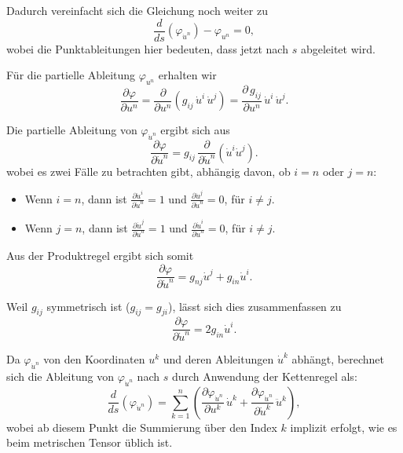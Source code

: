 Dadurch vereinfacht sich die Gleichung noch weiter zu
\begin{equation}
	\frac{d}{ds} \left( \varphi_{\dot{u}^n} \right) - \varphi_{u^n} = 0,
\end{equation}
wobei die Punktableitungen hier bedeuten, dass jetzt nach $s$ abgeleitet wird.

Für die partielle Ableitung $\varphi_{u^n}$ erhalten wir
\begin{equation} 
	\frac{\partial \varphi}{\partial u^n} = \frac{\partial}{\partial u^n} \left(g_{ij} \, \dot{u}^i \, \dot{u}^j\right) = \frac{\partial \, g_{ij}}{\partial u^n} \, \dot{u}^i \, \dot{u}^j. 
\end{equation}

Die partielle Ableitung von $\varphi_{\dot{u}^n}$ ergibt sich aus
\begin{equation}
	\frac{\partial \varphi}{\partial \dot{u}^n} = g_{ij} \, \frac{\partial}{\partial \dot{u}^n} \left( \dot{u}^i \dot{u}^j \right).
\end{equation}
wobei es zwei Fälle zu betrachten gibt, abhängig davon, ob $i = n$ oder $j = n$:
\begin{itemize}
	\item Wenn $i = n$, dann ist $\frac{\partial \dot{u}^i}{\partial \dot{u}^n} = 1$ und $\frac{\partial \dot{u}^j}{\partial \dot{u}^n} = 0$, für $i \neq j$.
	\item Wenn $j = n$, dann ist $\frac{\partial \dot{u}^j}{\partial \dot{u}^n} = 1$ und $\frac{\partial \dot{u}^i}{\partial \dot{u}^n} = 0$, für $i \neq j$.
\end{itemize}

Aus der Produktregel ergibt sich somit
\begin{equation}
	\frac{\partial \varphi}{\partial \dot{u}^n} = g_{nj} \dot{u}^j + g_{in} \dot{u}^i.
\end{equation}

Weil $g_{ij}$ symmetrisch ist ($g_{ij} = g_{ji}$), lässt sich dies zusammenfassen zu
\begin{equation}
	\frac{\partial \varphi}{\partial \dot{u}^n} = 2g_{in} \dot{u}^i.
\end{equation}

Da $\varphi_{\dot{u}^n}$ von den Koordinaten $u^k$ und deren Ableitungen $\dot{u}^k$ abhängt, berechnet sich die Ableitung von $\varphi_{\dot{u}^n}$ nach $s$ durch Anwendung der Kettenregel als:
\begin{equation}
	\frac{d}{ds} \left( \varphi_{\dot{u}^n} \right) = \sum_{k = 1}^n \left( \frac{\partial \varphi_{\dot{u}^n}}{\partial u^k} \, \dot{u}^k + \frac{\partial \varphi_{\dot{u}^n}}{\partial \dot{u}^k} \, \ddot{u}^k \right),
\end{equation}
wobei ab diesem Punkt die Summierung über den Index $k$ implizit erfolgt, wie es beim metrischen Tensor üblich ist.

